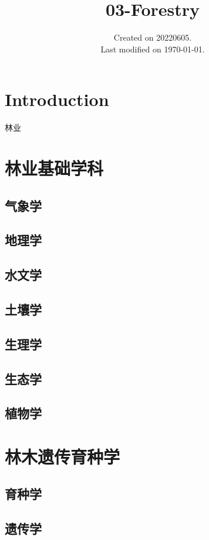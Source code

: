 \documentclass[UTF8]{../ApplicationUniverse}
\begin{document}
\title{03-Forestry}
\date{Created on 20220605.\\   Last modified on \today.}
\maketitle
\tableofcontents


\chapter{Introduction}

林业

\chapter{林业基础学科}
\section{气象学}
\section{地理学}
\section{水文学}
\section{土壤学}
\section{生理学}
\section{生态学}
\section{植物学}

\chapter{林木遗传育种学}
\section{育种学}
\section{遗传学}
\end{document}
